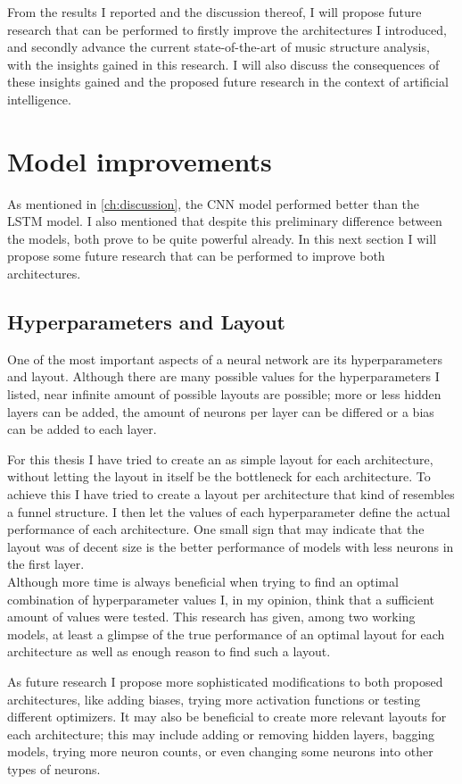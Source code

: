 From the results I reported and the discussion thereof, I will propose future research that can be performed to firstly improve the architectures I introduced, and secondly advance the current state-of-the-art of music structure analysis, with the insights gained in this research. I will also discuss the consequences of these insights gained and the proposed future research in the context of artificial intelligence.


\section{Model improvements}
As mentioned in \autoref{ch:discussion}, the CNN model performed better than the LSTM model. I also mentioned that despite this preliminary difference between the models, both prove to be quite powerful already. In this next section I will propose some future research that can be performed to improve both architectures.

\subsection{Hyperparameters and Layout}
One of the most important aspects of a neural network are its hyperparameters and layout. Although there are many possible values for the hyperparameters I listed, near infinite amount of possible layouts are possible; more or less hidden layers can be added, the amount of neurons per layer can be differed or a bias can be added to each layer. 

For this thesis I have tried to create an as simple layout for each architecture, without letting the layout in itself be the bottleneck for each architecture. To achieve this I have tried to create a layout per architecture that kind of resembles a funnel structure. I then let the values of each hyperparameter define the actual performance of each architecture. One small sign that may indicate that the layout was of decent size is the better performance of models with less neurons in the first layer.\\
Although more time is always beneficial when trying to find an optimal combination of hyperparameter values I, in my opinion, think that a sufficient amount of values were tested. This research has given, among two working models, at least a glimpse of the true performance of an optimal layout for each architecture as well as enough reason to find such a layout.

As future research I propose more sophisticated modifications to both proposed architectures, like adding biases, trying more activation functions or testing different optimizers. It may also be beneficial to create more relevant layouts for each architecture; this may include adding or removing hidden layers, bagging models, trying more neuron counts, or even changing some neurons into other types of neurons.

